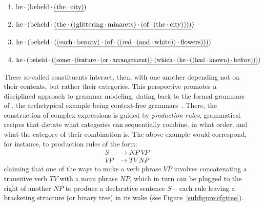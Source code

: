 {\smaller%
\begin{enumerate}
\item $\text{he}\mkern-0.5mu\cdot\mkern-0.5mu (\text{beheld}\mkern-0.5mu\cdot\mkern-0.5mu \underline{(\text{the}\mkern-0.5mu\cdot\mkern-0.5mu \text{city})})$
\item $\text{he}\mkern-0.5mu\cdot\mkern-0.5mu (\text{beheld}\mkern-0.5mu\cdot\mkern-0.5mu \underline{(\text{the}\mkern-0.5mu\cdot\mkern-0.5mu ((\text{glittering}\mkern-0.5mu\cdot\mkern-0.5mu {\text{minarets}})\mkern-0.5mu\cdot\mkern-0.5mu (\text{of}\mkern-0.5mu\cdot\mkern-0.5mu (\text{the}\mkern-0.5mu\cdot\mkern-0.5mu \text{city}))))})$
\item $\text{he}\mkern-0.5mu\cdot\mkern-0.5mu (\text{beheld}\mkern-0.5mu\cdot\mkern-0.5mu (\underline{(\text{such}\mkern-0.5mu\cdot\mkern-0.5mu \text{beauty})\mkern-0.5mu\cdot\mkern-0.5mu (\text{of}\mkern-0.5mu\cdot\mkern-0.5mu ((\text{red}\mkern-0.5mu\cdot\mkern-0.5mu (\text{and}\mkern-0.5mu\cdot\mkern-0.5mu \text{white}))\mkern-0.5mu\cdot\mkern-0.5mu \text{flowers})))})$
\item $\text{he}\mkern-0.5mu\cdot\mkern-0.5mu (\text{beheld}\mkern-0.5mu\cdot\mkern-0.5mu (\underline{
	(
		\text{some}\mkern-0.5mu\cdot\mkern-0.5mu 
			(\text{feature}\mkern-0.5mu\cdot\mkern-0.5mu 
				(\text{or}\mkern-0.5mu\cdot\mkern-0.5mu \text{arrangement})
			)\!\mkern-0.5mu\cdot\mkern-0.5mu \!
			(\text{which}\mkern-0.5mu\cdot\mkern-0.5mu 
				(\text{he}\mkern-0.5mu\cdot\mkern-0.5mu 
					(
						(\text{had}\mkern-0.5mu\cdot\mkern-0.5mu \text{known})\mkern-0.5mu\cdot\mkern-0.5mu 
						\text{before}
					)					
				)
			)})$
\end{enumerate}}%

\noindent These so-called constituents interact, then, with one another depending not on their contents, but rather their categories.
This perspective promotes a disciplined approach to grammar modeling, dating back to the formal grammars of \citet{chomsky1956three}, the archetypical example being context-free grammars~\cite{chomsky1956three,jw1959c}.
There, the construction of complex expressions is guided by \textit{production rules}, grammatical recipes that dictate what categories can sequentially combine, in what order, and what the category of their combination is.
The above example would correspond, for instance, to production rules of the form:
\begin{align}
	S 	& 	\to NP \ VP \label{equation:sfromnpvp}\\
	VP 	&	\to TV \ NP \label{equation:vpfromtvnvp}
\end{align}
claiming that one of the ways to make a verb phrase $VP$ involves concatenating a transitive verb $TV$ with a noun phrase $NP$, which in turn can be plugged to the right of another $NP$ to produce a declarative sentence $S$ -- each rule leaving a bracketing structure (or binary tree) in its wake (see Figure~\ref{subfigure:cfgtree}).


